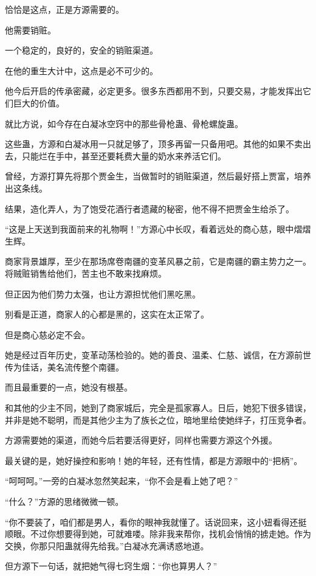 \begin{this_body}
恰恰是这点，正是方源需要的。

他需要销赃。

一个稳定的，良好的，安全的销赃渠道。

在他的重生大计中，这点是必不可少的。

他今后开启的传承密藏，必定更多。很多东西都用不到，只要交易，才能发挥出它们巨大的价值。

就比方说，如今存在白凝冰空窍中的那些骨枪蛊、骨枪螺旋蛊。

这些蛊，方源和白凝冰用一只就足够了，顶多再留一只备用吧。其他的如果不卖出去，只能烂在手中，甚至还要耗费大量的奶水来养活它们。

曾经，方源打算先将那个贾金生，当做暂时的销赃渠道，然后最好搭上贾富，培养出这条线。

结果，造化弄人，为了饱受花酒行者遗藏的秘密，他不得不把贾金生给杀了。

“这是上天送到我面前来的礼物啊！”方源心中长叹，看着远处的商心慈，眼中熠熠生辉。

商家背景雄厚，至少在那场席卷南疆的变革风暴之前，它是南疆的霸主势力之一。将贼赃销售给他们，苦主也不敢来找麻烦。

但正因为他们势力太强，也让方源担忧他们黑吃黑。

别看是正道，商家人的心都是黑的，这实在太正常了。

但是商心慈必定不会。

她是经过百年历史，变革动荡检验的。她的善良、温柔、仁慈、诚信，在方源前世传为佳话，美名流传整个南疆。

而且最重要的一点，她没有根基。

和其他的少主不同，她到了商家城后，完全是孤家寡人。日后，她犯下很多错误，并非是她不聪明，而是其他少主为了族长之位，暗地里给使她绊子，打压竞争者。

方源需要她的渠道，而她今后若要活得更好，同样也需要方源这个外援。

最关键的是，她好操控和影响！她的年轻，还有性情，都是方源眼中的“把柄”。

“呵呵呵。”一旁的白凝冰忽然笑起来，“你不会是看上她了吧？”

“什么？”方源的思绪微微一顿。

“你不要装了，咱们都是男人，看你的眼神我就懂了。话说回来，这小妞看得还挺顺眼。不过你想要得到她，可就难喽。除非我来帮你，找机会悄悄的掳走她。作为交换，你那只阳蛊就得先给我。”白凝冰充满诱惑地道。

但方源下一句话，就把她气得七窍生烟：“你也算男人？”


\end{this_body}
